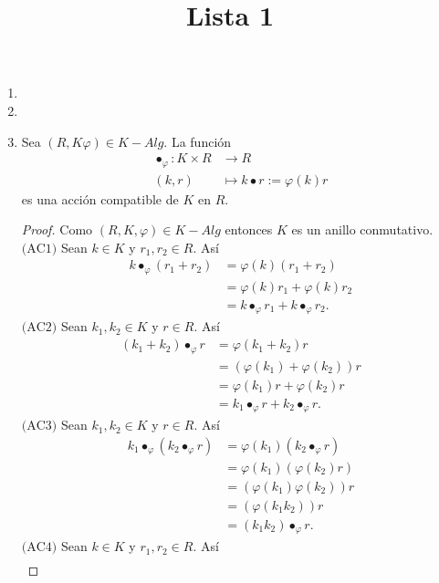 \documentclass{article}
\title{Lista 1}
\author{}
\date{}
\newcommand{\lrprth}[1]{
    \left(#1\right)
}
\newcommand{\descapp}[6]{
    #1: #2 &\rightarrow #3\\
    #4 &\mapsto #5#6 
}
\theoremstyle{definition}
\theoremstyle{plain}
\theoremstyle{plain}
\theoremstyle{definition}
\theoremstyle{definition}
\theoremstyle{definition}
\theoremstyle{definition}
\theoremstyle{definition}
\theoremstyle{definition}
\begin{document}
\maketitle
\begin{enumerate}[label=\textbf{Ej \arabic*.}]
\item
    \item
    \item Sea $\lrprth{R,K\varphi}\in K-Alg$. La función 
    \begin{align*}
        \descapp{\bullet_\varphi}{K\times R}{R}{(k,r)}{k\bullet r:=\varphi\lrprth{k}r}{}
    \end{align*}
    es una acción compatible de $K$ en $R$.
    \begin{proof}
    Como $\lrprth{R,K,\varphi}\in K-Alg$ entonces $K$ es un anillo conmutativo.\\
    $\boxed{\text{(AC1)}}$ Sean $k\in K$ y $r_1,r_2\in R$. Así
    \begin{align*}
        k\bullet_\varphi\lrprth{r_1+r_2}&=\varphi\lrprth{k}\lrprth{r_1+r_2}\\
        &=\varphi\lrprth{k}r_1+\varphi\lrprth{k}r_2\\
        &=k\bullet_\varphi r_1+k\bullet_\varphi r_2.
    \end{align*}
    $\boxed{\text{(AC2)}}$ Sean $k_1,k_2\in K$ y $r\in R$. Así
    \begin{align*}
        \lrprth{k_1+k_2}\bullet_\varphi r&=\varphi\lrprth{k_1+k_2}r\\
        &=\lrprth{\varphi(k_1)+\varphi(k_2)}r\\
        &=\varphi(k_1)r+\varphi(k_2)r\\
        &=k_1\bullet_\varphi r+k_2\bullet_\varphi r.
    \end{align*}
    $\boxed{\text{(AC3)}}$ Sean $k_1,k_2\in K$ y $r\in R$. Así
    \begin{align*}
        k_1\bullet_\varphi\lrprth{k_2\bullet_\varphi r}&=\varphi\lrprth{k_1}\lrprth{k_2\bullet_\varphi r}\\
        &=\varphi\lrprth{k_1}\lrprth{\varphi\lrprth{k_2}r}\\
        &=\lrprth{\varphi\lrprth{k_1}\varphi\lrprth{k_2}}r\\
        &=\lrprth{\varphi\lrprth{k_1k_2}}r\\
        &=\lrprth{k_1k_2}\bullet_\varphi r.
    \end{align*}
     $\boxed{\text{(AC4)}}$ Sean $k\in K$ y $r_1,r_2\in R$. Así
    \begin{align*}

\end{align*}
\end{proof}
\end{enumerate}
\end{document}
